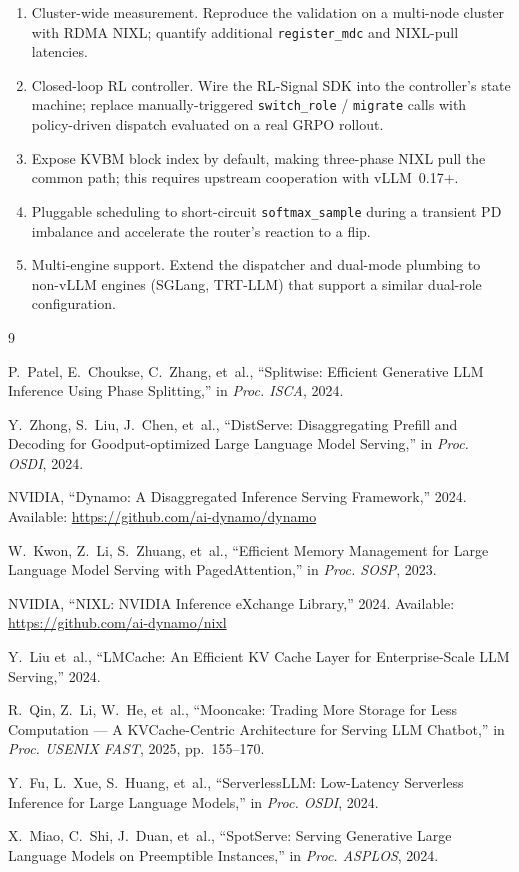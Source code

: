 \documentclass[10pt,twocolumn,letterpaper]{article}
\begin{document}
\begin{enumerate}[nosep]
\item Cluster-wide measurement. Reproduce the validation on a multi-node cluster with RDMA NIXL; quantify additional \texttt{register\_mdc} and NIXL-pull latencies.
\item Closed-loop RL controller. Wire the RL-Signal SDK into the controller's state machine; replace manually-triggered \texttt{switch\_role} / \texttt{migrate} calls with policy-driven dispatch evaluated on a real GRPO rollout.
\item Expose KVBM block index by default, making three-phase NIXL pull the common path; this requires upstream cooperation with vLLM~0.17+.
\item Pluggable scheduling to short-circuit \texttt{softmax\_sample} during a transient PD imbalance and accelerate the router's reaction to a flip.
\item Multi-engine support. Extend the dispatcher and dual-mode plumbing to non-vLLM engines (SGLang, TRT-LLM) that support a similar dual-role configuration.
\end{enumerate}

{
\small

\begin{thebibliography}{9}

P.~Patel, E.~Choukse, C.~Zhang, et~al., ``Splitwise: Efficient Generative LLM Inference Using Phase Splitting,'' in \emph{Proc. ISCA}, 2024.

Y.~Zhong, S.~Liu, J.~Chen, et~al., ``DistServe: Disaggregating Prefill and Decoding for Goodput-optimized Large Language Model Serving,'' in \emph{Proc. OSDI}, 2024.

NVIDIA, ``Dynamo: A Disaggregated Inference Serving Framework,'' 2024. Available: \url{https://github.com/ai-dynamo/dynamo}

W.~Kwon, Z.~Li, S.~Zhuang, et~al., ``Efficient Memory Management for Large Language Model Serving with PagedAttention,'' in \emph{Proc. SOSP}, 2023.

NVIDIA, ``NIXL: NVIDIA Inference eXchange Library,'' 2024. Available: \url{https://github.com/ai-dynamo/nixl}

Y.~Liu et~al., ``LMCache: An Efficient KV Cache Layer for Enterprise-Scale LLM Serving,'' 2024.

R.~Qin, Z.~Li, W.~He, et~al., ``Mooncake: Trading More Storage for Less Computation --- A KVCache-Centric Architecture for Serving LLM Chatbot,'' in \emph{Proc. USENIX FAST}, 2025, pp.~155--170.

Y.~Fu, L.~Xue, S.~Huang, et~al., ``ServerlessLLM: Low-Latency Serverless Inference for Large Language Models,'' in \emph{Proc. OSDI}, 2024.

X.~Miao, C.~Shi, J.~Duan, et~al., ``SpotServe: Serving Generative Large Language Models on Preemptible Instances,'' in \emph{Proc. ASPLOS}, 2024.

\end{thebibliography}
}

\end{document}
